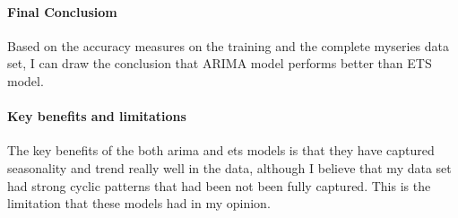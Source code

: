 \documentclass[
]{article}
\begin{document}
\hypertarget{final-conclusiom}{%
\paragraph{Final Conclusiom}\label{final-conclusiom}}

Based on the accuracy measures on the training and the complete myseries
data set, I can draw the conclusion that ARIMA model performs better
than ETS model.

\hypertarget{key-benefits-and-limitations}{%
\paragraph{Key benefits and
limitations}\label{key-benefits-and-limitations}}

The key benefits of the both arima and ets models is that they have
captured seasonality and trend really well in the data, although I
believe that my data set had strong cyclic patterns that had been not
been fully captured. This is the limitation that these models had in my
opinion.
\end{document}
